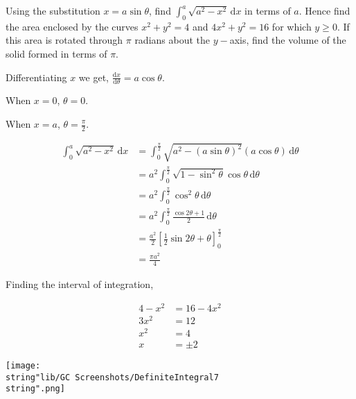 \documentclass[11pt,a4paper]{book}
\begin{document}
\begin{example}

Using the substitution $x=a\sin\theta$, find ${\displaystyle \int_{0}^{a}\sqrt{a^{2}-x^{2}}\,\mathrm{d}x}$
in terms of $a$. Hence find the area enclosed by the curves $x^{2}+y^{2}=4$
and $4x^{2}+y^{2}=16$ for which $y\geq0$. If this area is rotated
through $\pi$ radians about the $y-$axis, find the volume of the
solid formed in terms of $\pi$.

\Solution

Differentiating $x$ we get, ${\displaystyle \frac{\mathrm{d}x}{\mathrm{d}\theta}=a\cos\theta}$.

When $x=0$, $\theta=0$.

When $x=a$, ${\displaystyle \theta=\frac{\pi}{2}}$.

\begin{align*}
\int_{0}^{a}\sqrt{a^{2}-x^{2}}\,\mathrm{d}x & =\int_{0}^{\frac{\pi}{2}}\sqrt{a^{2}-\left(a\sin\theta\right)^{2}}\left(a\cos\theta\right)\,\mathrm{d}\theta\\
 & =a^{2}\int_{0}^{\frac{\pi}{2}}\sqrt{1-\sin^{2}\theta}\cos\theta\,\mathrm{d}\theta\\
 & =a^{2}\int_{0}^{\frac{\pi}{2}}\cos^{2}\theta\,\mathrm{d}\theta\\
 & =a^{2}\int_{0}^{\frac{\pi}{2}}\frac{\cos2\theta+1}{2}\,\mathrm{d}\theta\\
 & =\frac{a^{2}}{2}\left[\frac{1}{2}\sin2\theta+\theta\right]_{0}^{\frac{\pi}{2}}\\
 & =\frac{\pi a^{2}}{4}
\end{align*}

\begin{minipage}[t]{0.7\textwidth}

Finding the interval of integration,

\begin{align*}
4-x^{2} & =16-4x^{2}\\
3x^{2} & =12\\
x^{2} & =4\\
x & =\pm2
\end{align*}

\end{minipage}
\begin{minipage}[t]{0.3\textwidth}

\texttt{[image: \\string"lib/GC Screenshots/DefiniteIntegral7\\string".png]}

\end{minipage}


\end{example}
\end{document}
